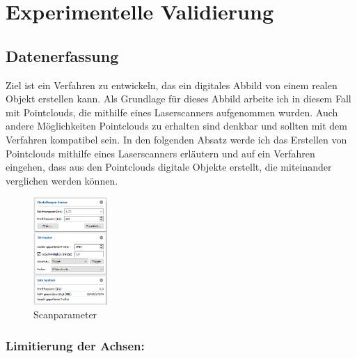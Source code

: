 \documentclass[../main.tex]{subfiles}
\begin{document}
\section{Experimentelle Validierung}

\subsection{Datenerfassung}
Ziel ist ein Verfahren zu entwickeln, das ein digitales Abbild von einem realen Objekt
erstellen kann.
Als Grundlage für dieses Abbild arbeite ich in diesem Fall mit Pointclouds, 
die mithilfe eines Laserscanners aufgenommen wurden. Auch andere Möglichkeiten
Pointclouds zu erhalten sind denkbar und sollten mit dem Verfahren 
kompatibel sein. In den folgenden Absatz werde ich das Erstellen von Pointclouds 
mithilfe eines Laserscanners erläutern und auf ein Verfahren eingehen, dass aus 
den Pointclouds digitale Objekte erstellt, die miteinander verglichen werden können.


\newpage

\begin{figure}
    \includegraphics[width=0.25\textwidth]{images/Parameter_Scan.png}
    \caption{Scanparameter}
    \label{fig:scanparameter}
\end{figure}

\subsubsection{Limitierung der Achsen:}
\end{document}
